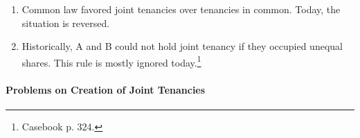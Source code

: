 \begin{enumerate}
\begin{enumerate}
\begin{enumerate}
\begin{enumerate}
                and identical interests measured by duration.
                \item \emph{Possession}: each must have a right to possession 
                of the whole. After the joint tenancy is created, one joint 
                tenant can voluntarily give exclusive possession to another.
            \end{enumerate}
            \item If any unity is lacking, a tenancy in common is created.
            \item If any unities are later severed, the joint tenancy becomes 
            a tenancy in common. Any one joint tenant can unilaterally convert 
            a joint tenancy into a tenancy in common by conveying his interest 
            to a third party. 
        \end{enumerate}
        \item \textbf{Tenancy by the entirety}: created only in husband and 
        wife.\footnote{Casebook p. 321.}
        \begin{enumerate}
            \item Requires the four unities, plus a fifth---marriage.
            \item Today it exists in less than half the states.
        \end{enumerate}
    \end{enumerate}
    \item Common law favored joint tenancies over tenancies in common. Today, 
    the situation is reversed.
    \item Historically, A and B could not hold joint tenancy if they occupied 
    unequal shares. This rule is mostly ignored today.\footnote{Casebook p. 
    324.}
\end{enumerate}

\paragraph{Problems on Creation of Joint Tenancies}


